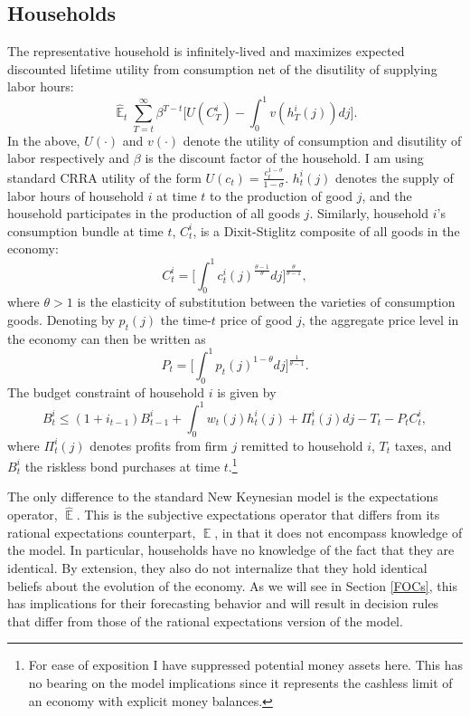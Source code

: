 \documentclass[11pt]{article}
\renewcommand{\[}{\begin{equation}}
\renewcommand{\]}{\end{equation}}
\DeclareMathOperator{\E}{\mathbb{E}}
\begin{document}
\subsection{Households}
The representative household is infinitely-lived and maximizes expected discounted lifetime utility from consumption net of the disutility of supplying labor hours:
\begin{equation}
\hat{\E}_t\sum^{\infty}_{T=t}\beta^{T-t} \bigg[ U(C^i_T) - \int_0^1 v(h^i_T(j)) dj \bigg].
\label{lifetime_U}
\end{equation}
In the above, $U(\cdot)$ and $v(\cdot)$ denote the utility of consumption and disutility of labor respectively and $\beta$ is the discount factor of the household. I am using standard CRRA utility of the form $U(c_t) = \frac{c_t^{1-\sigma}}{1-\sigma}$. $h^i_t(j)$ denotes the supply of labor hours of household $i$ at time $t$ to the production of good $j$, and the household participates in the production of all goods $j$. Similarly, household $i$'s consumption bundle at time $t$,  $C_t^i$, is a Dixit-Stiglitz composite of all goods in the economy:
\begin{equation}
C^i_t =  \bigg[  \int_0^1 c^i_t(j)^{\frac{\theta-1}{\theta}} dj \bigg]^{\frac{\theta}{\theta-1}}\label{dixit},
\end{equation}
where $\theta>1$ is the elasticity of substitution between the varieties of consumption goods. Denoting by $p_t(j)$ the time-$t$ price of good $j$, the aggregate price level in the economy can then be written as
\begin{equation}
P_t =  \bigg[  \int_0^1 p_t(j)^{1-\theta} dj \bigg]^{\frac{1}{\theta-1}}.
\label{agg_price}
\end{equation}
The budget constraint of household $i$ is given by
\begin{equation}
 B^i_t \leq (1+i_{t-1})B^i_{t-1} + \int_0^1 w_t(j)h^i_t(j) + \Pi_t^i(j)  dj-T_t -P_tC^i_t,
 \label{BC}
\end{equation}
where $\Pi_t^i(j)$ denotes profits from firm $j$ remitted to household $i$, $T_t$ taxes, and $B^i_t$ the riskless bond purchases at time $t$.\footnote{For ease of exposition I have suppressed potential money assets here. This has no bearing on the model implications since it represents the cashless limit of an economy with explicit money balances.}

The only difference to the standard New Keynesian model is the expectations operator, $\hat{\E}$. This is the subjective expectations operator that differs from its rational expectations counterpart, $\E$, in that it does not encompass knowledge of the model. In particular, households have no knowledge of the fact that they are identical. By extension, they also do not internalize that they hold identical beliefs about the evolution of the economy. As we will see in Section \ref{FOCs}, this has implications for their forecasting behavior and will result in decision rules that differ from those of the rational expectations version of the model.
\end{document}
